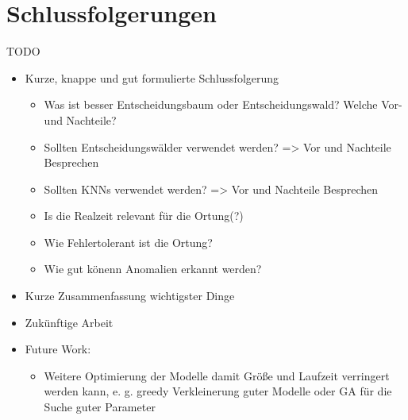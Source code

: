 \chapter{Schlussfolgerungen}
TODO

\begin{itemize}
    \item Kurze, knappe und gut formulierte Schlussfolgerung
    \begin{itemize}
        \item Was ist besser Entscheidungsbaum oder Entscheidungswald? Welche Vor- und Nachteile?
        \item Sollten Entscheidungswälder verwendet werden? => Vor und Nachteile Besprechen
        \item Sollten KNNs verwendet werden? => Vor und Nachteile Besprechen
        \item Is die Realzeit relevant für die Ortung(?)
        \item Wie Fehlertolerant ist die Ortung?
        \item Wie gut könenn Anomalien erkannt werden?
    \end{itemize}
    \item Kurze Zusammenfassung wichtigster Dinge
    \item Zukünftige Arbeit
    \item Future Work:
    \begin{itemize}
        \item Weitere Optimierung der Modelle damit Größe und Laufzeit verringert werden kann,
              e. g. greedy Verkleinerung guter Modelle oder GA für die Suche guter Parameter
    \end{itemize}
\end{itemize}